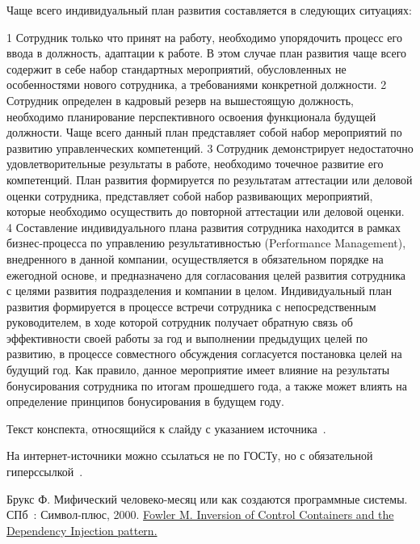 \documentclass{../industrial-development}
\begin{document}
\lecturenotes
Чаще всего индивидуальный план развития составляется в следующих ситуациях:

1 Сотрудник только что принят на работу, необходимо упорядочить процесс его ввода в должность, адаптации к работе. В этом случае план развития чаще всего содержит в себе набор стандартных мероприятий, обусловленных не особенностями нового сотрудника, а требованиями конкретной должности.
2 Сотрудник определен в кадровый резерв на вышестоящую должность, необходимо планирование перспективного освоения функционала будущей должности. Чаще всего данный план представляет собой набор мероприятий по развитию управленческих компетенций.
3 Сотрудник демонстрирует недостаточно удовлетворительные результаты в работе, необходимо точечное развитие его компетенций. План развития формируется по результатам аттестации или деловой оценки сотрудника, представляет собой набор развивающих мероприятий, которые необходимо осуществить до повторной аттестации или деловой оценки.
4 Составление индивидуального плана развития сотрудника находится в рамках бизнес-процесса по управлению результативностью (Performance Management), внедренного в данной компании, осуществляется в обязательном порядке на ежегодной основе, и предназначено для согласования целей развития сотрудника с целями развития подразделения и компании в целом. Индивидуальный план развития формируется в процессе встречи сотрудника с непосредственным руководителем, в ходе которой сотрудник получает обратную связь об эффективности своей работы за год и выполнении предыдущих целей по развитию, в процессе совместного обсуждения согласуется постановка целей на будущий год. Как правило, данное мероприятие имеет влияние на результаты бонусирования сотрудника по итогам прошедшего года, а также может влиять на определение принципов бонусирования в будущем году.


\lecturenotes

Текст конспекта, относящийся к слайду с указанием источника~\cite[с.~97--99]{Brooks}.

На интернет-источники можно ссылаться не по ГОСТу, но с обязательной гиперссылкой~\cite{Fowler}.

\begin{thebibliography}{99}
 Брукс Ф. Мифический человеко-месяц или как создаются программные системы. СПб~: Символ-плюс, 2000.
 \href{https://martinfowler.com/articles/injection.html}{Fowler M. Inversion of Control Containers and the Dependency Injection pattern.}
\end{thebibliography}
\end{document}
